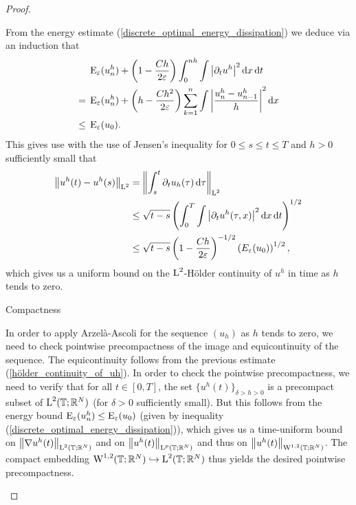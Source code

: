 \begin{proof}
\begin{description}[wide=0pt]
	From the energy estimate (\ref{discrete_optimal_energy_dissipation}) we deduce via an induction that
	\begin{align*}
		& \operatorname{E}_{ \varepsilon } ( u_{ n }^{ h } )
		+
		\left(
			1
			-
			\frac{ C h  }{ 2 \varepsilon }
		\right)
		\int_{ 0 }^{ n h }
			\int
				\abs{ \partial_{ t } u^{ h } }^{ 2 }
			\dd{ x }
		\dd{ t }
		\\
		={} &
		\operatorname{E}_{ \varepsilon } ( u_{ n }^{ h } )
		+
		\left(
			h - \frac{ C h^{ 2 }}{ 2 \varepsilon }
		\right)
		\sum_{k = 1 }^{ n }
			\int
				 \abs{
				 	\frac{ u_{ n }^{ h } - u_{ n - 1 }^{ h } }{ h }
			 	}^{ 2 }
		 	\dd{ x }
		 \\
		\leq {} &
		\operatorname{E}_{ \varepsilon } ( u_{ 0 } ).
	\end{align*}
	This gives use with the use of Jensen's inequality for $ 0\leq s \leq t \leq T $ and $ h > 0 $ sufficiently small that
	\begin{align}
		\norm{ u^{ h } ( t ) - u^{ h } ( s ) }_{ \operatorname{L}^{ 2 } }
		& =
		\norm{ 
			\int_{ s }^{ t }
				\partial_{ t } u_{ h } ( \tau )
			\dd{ \tau }
		}_{ \operatorname{L}^{ 2 } }
		\notag
		\\
		& \leq
		\sqrt{ t - s }
		\left(	
			\int_{ 0 }^{ T }
					\int
						\abs{ \partial_{ t } u^{ h } ( \tau, x ) }^{ 2 }
					\dd{ x }
				\dd{ t }
		\right)^{ 1/2 }
		\notag
		\\
		\label{hölder_continuity_of_uh}
		& \leq
		\sqrt{ t - s }
		\left(
			1 - \frac{ C h }{ 2 \varepsilon }
		\right)^{ - 1/2 }
		\left(  E_{ \varepsilon } ( u_{ 0 } ) \right)^{ 1/ 2 },
	\end{align}
	which gives us a uniform bound on the $ \operatorname{L}^{ 2 }$-Hölder continuity of $ u^{ h } $ in time as $ h $ tends to zero.
	
	\item[Step 5:] Compactness
	
	In order to apply Arzelà-Ascoli for the sequence $ (u_{ h } ) $ as $ h $ tends to zero, we need to check pointwise precompactness of the image and equicontinuity of the sequence. 
	The equicontinuity follows from the previous estimate (\ref{hölder_continuity_of_uh}).
	In order to check the pointwise precompactness, we need to verify that for all $ t \in [ 0 , T ] $, the set
	$ \{ u^{ h } ( t ) \}_{ \delta > h > 0 } $ is a precompact subset of $ \operatorname{L}^{ 2 } ( \mathbb{ T } ; \mathbb{ R }^{ N } ) $ (for $ \delta > 0 $ sufficiently small). 
	But this follows from the energy bound $ \operatorname{E}_{ \varepsilon } ( u_{ n }^{ h } ) \leq \operatorname{E}_{ \varepsilon } ( u_{ 0 } ) $ (given by inequality (\ref{discrete_optimal_energy_dissipation})), which gives us a time-uniform bound on $ \norm{ \nabla u^{ h }( t ) }_{\operatorname{L}^{ 2 }( \mathbb{ T }; \mathbb{ R }^{ N } ) } $ and on $ \norm{ u^{ h } ( t )}_{ \operatorname{L}^{ p } ( \mathbb{ T }; \mathbb{ R }^{ N } ) } $ and thus on $ \norm{ u^{ h } ( t )}_{ \operatorname{W}^{ 1 , 2 } ( \mathbb{ T }; \mathbb{ R }^{ N } ) } $. The compact embedding
	$ \operatorname{W}^{ 1 , 2 } ( \mathbb{ T } ; \mathbb{ R }^{ N } ) \hookrightarrow \operatorname{L}^{ 2 } ( \mathbb{ T }; \mathbb{ R }^{ N } ) $ thus yields the desired pointwise precompactness.
	

\end{description}
\end{proof}
